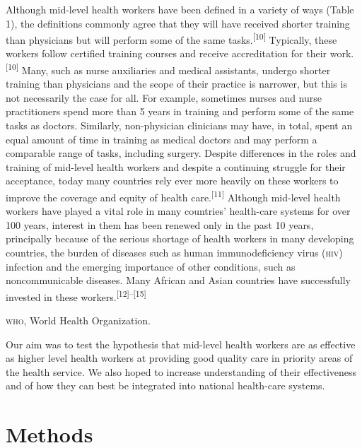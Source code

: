 \documentclass{article}
\begin{document}
Although mid-level health workers have been defined in a variety of ways (Table
1), the definitions commonly agree that they will have received shorter
training than physicians but will perform some of the same
tasks.\textsuperscript{[}\textsuperscript{10}\textsuperscript{]}
Typically, these workers follow certified training courses and receive
accreditation for their work.\textsuperscript{[}\textsuperscript{10}\textsuperscript{]}
Many, such as
nurse auxiliaries and medical assistants, undergo shorter training than
physicians and the scope of
their practice is narrower, but this is not necessarily the case for all. For
example, sometimes
nurses and nurse practitioners spend more than 5 years in training and perform
some of the
same tasks as doctors. Similarly, non-physician clinicians may have, in total,
spent an equal amount
of time in training as medical doctors and may perform a comparable range of
tasks, including
surgery. Despite differences in the roles and training of mid-level health
workers and despite a
continuing struggle for their acceptance, today many countries rely ever more
heavily on these
workers to improve the coverage and equity of health
care.\textsuperscript{[}\textsuperscript{11}\textsuperscript{]}
Although mid-level health workers have played a vital role in many
countries' health-care systems for over 100 years, interest in them has been
renewed
only in the past 10 years, principally because of the serious shortage of health
workers in
many developing countries, the burden of diseases such as human immunodeficiency
virus (\textsc{hiv})
infection and the emerging importance of other conditions, such as
noncommunicable diseases. Many
African and Asian countries have successfully invested in these
workers.\textsuperscript{[}\textsuperscript{12}\textsuperscript{]}\textsuperscript{–}\textsuperscript{[}\textsuperscript{15}\textsuperscript{]}

\textsc{who}, World Health Organization.

Our aim was to test the hypothesis that mid-level health workers are as
effective as higher level
health workers at providing good quality care in priority areas of the health
service. We also hoped
to increase understanding of their effectiveness and of how they can best be
integrated into
national health-care systems.

\section{Methods}
\end{document}
